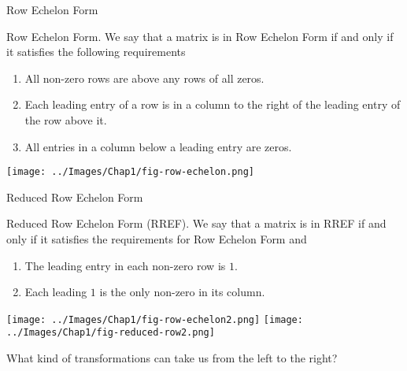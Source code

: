 \documentclass[xcoler=dvipsnames, aspectratio=169]{beamer}
\begin{document}
    \begin{frame}{Row Echelon Form}
        \small
        \begin{defn}
            Row Echelon Form. We say that a matrix is in Row Echelon Form if and only if
            it satisfies the following requirements
            \begin{enumerate}
                \item All non-zero rows are above any rows of all zeros.
                \item Each leading entry of a row is in a column to the right of the leading
                    entry of the row above it.
                \item All entries in a column below a leading entry are zeros.
            \end{enumerate}
        \end{defn}
        \pause
            \begin{example}
            \begin{center}
                \texttt{[image: ../Images/Chap1/fig-row-echelon.png]}
            \end{center}
            \end{example}
    \end{frame}
    \begin{frame}{Reduced Row Echelon Form}
        \small
        \begin{defn}
            Reduced Row Echelon Form (RREF). We say that a matrix is in RREF if and only if
            it satisfies the requirements for Row Echelon Form and 
            \begin{enumerate}
                \addtocounter{enumi}{3}
                \item The leading entry in each non-zero row is $1$.
                \item Each leading $1$ is the only non-zero in its column.
            \end{enumerate}
        \end{defn}
        \pause
        \begin{example}
            \begin{center}
                \texttt{[image: ../Images/Chap1/fig-row-echelon2.png]}\qquad\quad
                \texttt{[image: ../Images/Chap1/fig-reduced-row2.png]}
            \end{center}
        \end{example}
        \pause
        What kind of transformations can take us from the left to the right?
    \end{frame}
\end{document}
